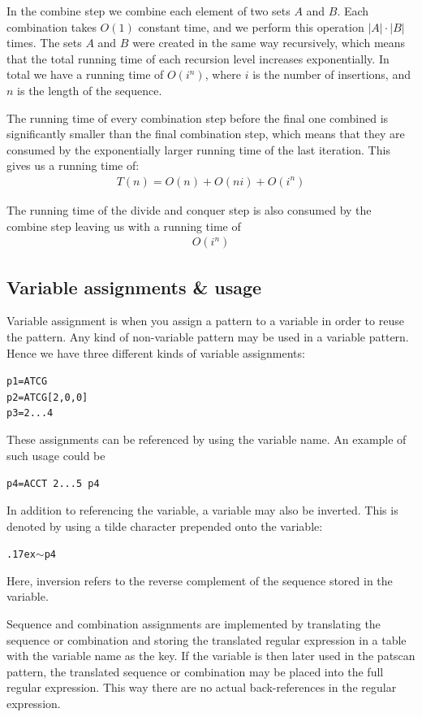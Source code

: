 \documentclass[12pt]{article}
\theoremstyle{definition}
\begin{document}
In the combine step we combine each element of two sets $A$ and $B$. Each combination takes $O(1)$ constant time, and we perform this operation $|A| \cdot |B|$ times. The sets $A$ and $B$ were created in the same way recursively, which means that the total running time of each recursion level increases exponentially. In total we have a running time of $O(i^n)$, where $i$ is the number of insertions, and $n$ is the length of the sequence.

The running time of every combination step before the final one combined is significantly smaller than the final combination step, which means that they are consumed by the exponentially larger running time of the last iteration. This gives us a running time of:
\begin{eqnarray}
	T(n) = O(n) + O(ni) + O(i^n)
\end{eqnarray}

The running time of the divide and conquer step is also consumed by the combine step leaving us with a running time of
\begin{eqnarray}
	O(i^n)
\end{eqnarray}

\subsection{Variable assignments \& usage}

Variable assignment is when you assign a pattern to a variable in order to reuse the pattern. Any kind of non-variable pattern may be used in a variable pattern. Hence we have three different kinds of variable assignments:

\texttt{p1=ATCG} \\
\texttt{p2=ATCG[2,0,0]} \\
\texttt{p3=2...4}

These assignments can be referenced by using the variable name. An example of such usage could be

\texttt{p4=ACCT 2...5 p4}

In addition to referencing the variable, a variable may also be inverted. This is denoted by using a tilde character prepended onto the variable:

\texttt{{\raise.17ex\hbox{$\scriptstyle\mathtt{\sim}$}}p4}

Here, inversion refers to the reverse complement of the sequence stored in the variable.

Sequence and combination assignments are implemented by translating the sequence or combination and storing the translated regular expression in a table with the variable name as the key. If the variable is then later used in the patscan pattern, the translated sequence or combination may be placed into the full regular expression. This way there are no actual back-references in the regular expression.
\end{document}

